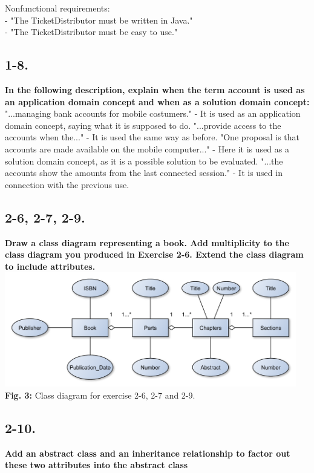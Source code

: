\documentclass[12pt]{article}
\begin{document}
Nonfunctional requirements:\\
- "The TicketDistributor must be written in Java."\\
- "The TicketDistributor must be easy to use."\\



\subsection{1-8.}
\textbf{In the following description, explain when the term account is used as an application domain concept and when as a solution domain concept:}\\
"...managing bank accounts for mobile costumers." - It is used as an application domain concept, saying what it is supposed to do. 
"...provide access to the accounts when the..." - It is used the same way as before. 
"One proposal is that accounts are made available on the mobile computer..." - Here it is used as a solution domain concept, as it is a possible solution to be evaluated. 
"...the accounts show the amounts from the last connected session." - It is used in connection with the previous use.\\



\subsection{2-6, 2-7, 2-9.}
\textbf{Draw a class diagram representing a book. Add multiplicity to the class diagram you produced in Exercise 2-6. Extend the class diagram to include attributes.}\\

\includegraphics[height=50mm]{2-6}\\
\textbf{Fig. 3:} Class diagram for exercise 2-6, 2-7 and 2-9.



\subsection{2-10.}
\textbf{Add an abstract class and an inheritance relationship to factor out these two attributes into the abstract class}\\
\end{document}
